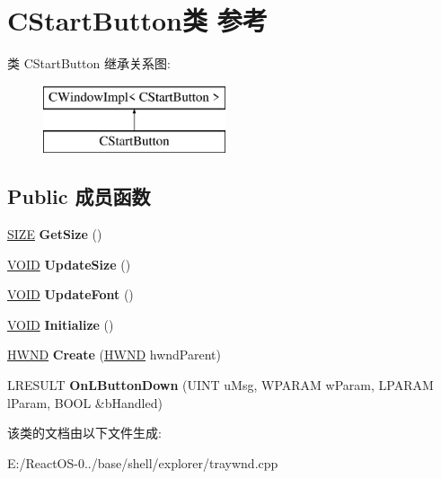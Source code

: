 \hypertarget{class_c_start_button}{}\section{C\+Start\+Button类 参考}
\label{class_c_start_button}
类 C\+Start\+Button 继承关系图\+:\begin{figure}[H]
\begin{center}
\leavevmode
\includegraphics[height=2.000000cm]{class_c_start_button}
\end{center}
\end{figure}
\subsection*{Public 成员函数}
\begin{DoxyCompactItemize}
\item 
\mbox{\label{class_c_start_button_a2936f3f021a5a953ffce1704b2531117}} 
\hyperlink{structtag_s_i_z_e}{S\+I\+ZE} {\bfseries Get\+Size} ()
\item 
\mbox{\label{class_c_start_button_a47903e19c0862f6f1fd66b424fbd2f6b}} 
\hyperlink{interfacevoid}{V\+O\+ID} {\bfseries Update\+Size} ()
\item 
\mbox{\label{class_c_start_button_a160024d020207dde521d1a8315692cff}} 
\hyperlink{interfacevoid}{V\+O\+ID} {\bfseries Update\+Font} ()
\item 
\mbox{\label{class_c_start_button_a09acdfc063e5ea25a6a9b4169b267b46}} 
\hyperlink{interfacevoid}{V\+O\+ID} {\bfseries Initialize} ()
\item 
\mbox{\label{class_c_start_button_ace34d520e92c47d7ce7989bd4041d23a}} 
\hyperlink{interfacevoid}{H\+W\+ND} {\bfseries Create} (\hyperlink{interfacevoid}{H\+W\+ND} hwnd\+Parent)
\item 
\mbox{\label{class_c_start_button_a21662eff14168bff89866595c426b060}} 
L\+R\+E\+S\+U\+LT {\bfseries On\+L\+Button\+Down} (U\+I\+NT u\+Msg, W\+P\+A\+R\+AM w\+Param, L\+P\+A\+R\+AM l\+Param, B\+O\+OL \&b\+Handled)
\end{DoxyCompactItemize}


该类的文档由以下文件生成\+:\begin{DoxyCompactItemize}
\item 
E\+:/\+React\+O\+S-\/0../base/shell/explorer/traywnd.\+cpp\end{DoxyCompactItemize}
